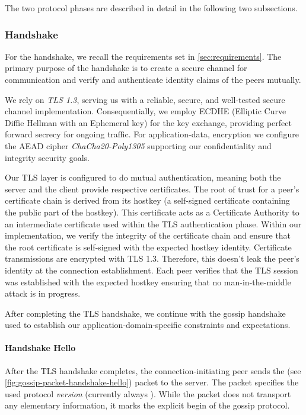 The two protocol phases are described in detail in the following two subsections.

\subsubsection{Handshake}

For the handshake, we recall the requirements set in \autoref{sec:requirements}.
The primary purpose of the handshake is to create a secure channel for communication and verify
and authenticate identity claims of the peers mutually.

We rely on \textit{TLS 1.3}, serving us with a reliable, secure, and well-tested secure channel implementation.
Consequentially, we employ ECDHE (Elliptic Curve Diffie Hellman with an Ephemeral key) for the key exchange,
providing perfect forward secrecy for ongoing traffic.
For application-data, encryption we configure the AEAD cipher \textit{ChaCha20-Poly1305} supporting our confidentiality
and integrity security goals.

Our TLS layer is configured to do mutual authentication, meaning both the server and the client provide respective
certificates.
The root of trust for a peer's certificate chain is derived from its hostkey (a self-signed certificate containing
the public part of the hostkey).
This certificate acts as a Certificate Authority to an intermediate certificate used within the TLS authentication phase.
Within our  implementation, we verify the integrity of the certificate chain and ensure that
the root certificate is self-signed with the expected hostkey identity.
Certificate transmissions are encrypted with TLS 1.3.
Therefore, this doesn't leak the peer's identity at the connection establishment.
Each peer verifies that the TLS session was established with the expected hostkey ensuring that no man-in-the-middle
attack is in progress.

After completing the TLS handshake, we continue with the gossip handshake used to establish our application-domain-specific
constraints and expectations.

\paragraph{Handshake Hello}

After the TLS handshake completes, the connection-initiating peer sends the
 (see \autoref{fig:gossip-packet-handshake-hello}) packet to the server.
The packet specifies the used protocol \textit{version} (currently always ).
While the packet does not transport any elementary information, it marks the explicit begin of the gossip protocol.

